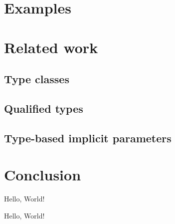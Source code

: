 \documentclass[acmlarge]{acmart}
\begin{document}
\section{Examples}

\section{Related work}

  \subsection{Type classes}

  \subsection{Qualified types}

  \subsection{Type-based implicit parameters}

\section{Conclusion}

Hello, World!

\begin{acks}

Hello, World!

\end{acks}



\end{document}
